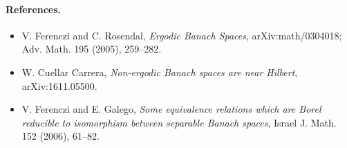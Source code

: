 \documentclass[11pt]{article}
\begin{document}
\paragraph{References.}
\begin{itemize}
\item V. Ferenczi and C. Rosendal, \emph{Ergodic Banach Spaces}, arXiv:math/0304018; Adv. Math. 195 (2005), 259--282.
\item W. Cuellar Carrera, \emph{Non-ergodic Banach spaces are near Hilbert}, arXiv:1611.05500.
\item V. Ferenczi and E. Galego, \emph{Some equivalence relations which are Borel reducible to isomorphism between separable Banach spaces}, Israel J. Math. 152 (2006), 61--82.
\end{itemize}
\end{document}
